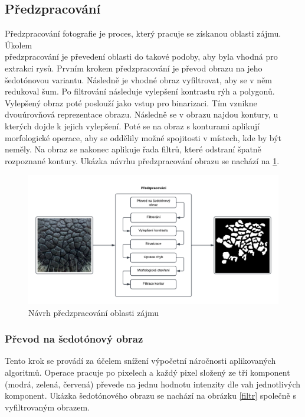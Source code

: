 \subsection{Předzpracování}

Předzpracování fotografie je proces, který pracuje se získanou oblasti zájmu. Úkolem \\ předzpracování je převedení oblasti do takové podoby, aby byla vhodná pro extrakci rysů. Prvním krokem předzpracování je převod obrazu na jeho šedotónovou variantu. Následně je vhodné obraz vyfiltrovat, aby se v něm redukoval šum. Po filtrování následuje vylepšení kontrastu rýh a polygonů. Vylepšený obraz poté poslouží jako vstup pro binarizaci. Tím vznikne dvouúrovňová reprezentace obrazu. Následně se v obrazu najdou kontury, u kterých dojde k jejich vylepšení. Poté se na obraz s konturami aplikují morfologické operace, aby se oddělily možné spojitosti v místech, kde by být neměly. Na obraz se nakonec aplikuje řada filtrů, které odstraní špatně rozpoznané kontury. Ukázka návrhu předzpracování obrazu se nachází na \ref{predzpracovani_navrh}.


\newpage
\begin{figure}[h]
	\centering
	\includegraphics[width=1\textwidth]{obrazky/predzpracovaniv2.png}
	\caption{Návrh předzpracování oblasti zájmu}
	\label{predzpracovani_navrh}
\end{figure} 

\subsubsection{Převod na šedotónový obraz}

Tento krok se provádí za účelem snížení výpočetní náročnosti aplikovaných algoritmů. Operace pracuje po pixelech a každý pixel složený ze tří komponent (modrá, zelená, červená) převede na jednu hodnotu intenzity dle vah jednotlivých komponent. Ukázka šedotónového obrazu se nachází na obrázku \ref{filtr} společně s vyfiltrovaným obrazem.


